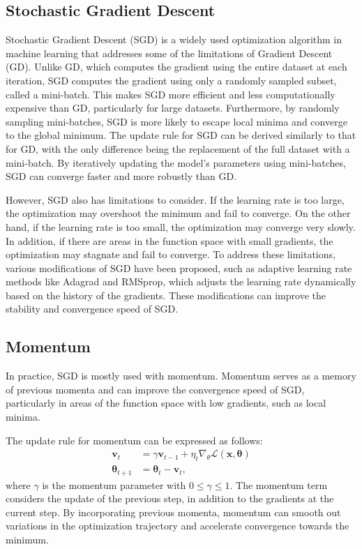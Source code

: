 \subsection{Stochastic Gradient Descent}
Stochastic Gradient Descent (SGD) is a widely used optimization algorithm in machine learning that addresses some of the limitations of Gradient Descent (GD).
Unlike GD, which computes the gradient using the entire dataset at each iteration, SGD computes the gradient using only a randomly sampled subset, called a mini-batch.
This makes SGD more efficient and less computationally expensive than GD, particularly for large datasets.
Furthermore, by randomly sampling mini-batches, SGD is more likely to escape local minima and converge to the global minimum.
The update rule for SGD can be derived similarly to that for GD, with the only difference being the replacement of the full dataset with a mini-batch.
By iteratively updating the model's parameters using mini-batches, SGD can converge faster and more robustly than GD.

However, SGD also has limitations to consider. If the learning rate is too large, the optimization may overshoot the minimum and fail to converge.
On the other hand, if the learning rate is too small, the optimization may converge very slowly.
In addition, if there are areas in the function space with small gradients, the optimization may stagnate and fail to converge.
To address these limitations, various modifications of SGD have been proposed, such as adaptive learning rate methods like Adagrad and RMSprop,
which adjusts the learning rate dynamically based on the history of the gradients.
These modifications can improve the stability and convergence speed of SGD.


\subsection{Momentum}

In practice, SGD is mostly used with momentum.
Momentum serves as a memory of previous momenta and can improve the convergence speed of SGD, particularly in areas of the function space with low gradients, such as local minima.

The update rule for momentum can be expressed as follows:
\begin{align}
\mathbf{v}_t &= \gamma \mathbf{v}_{t-1} + \eta_t \nabla_\theta \mathcal{L}(\mathbf{x}, \boldsymbol{\theta}) \\
\boldsymbol{\theta}_{t+1} &= \boldsymbol{\theta}_t - \mathbf{v}_t,
\end{align}
where $\gamma$ is the momentum parameter with $0 \leq \gamma \leq 1$.
The momentum term considers the update of the previous step, in addition to the gradients at the current step.
By incorporating previous momenta, momentum can smooth out variations in the optimization trajectory and accelerate convergence towards the minimum.

